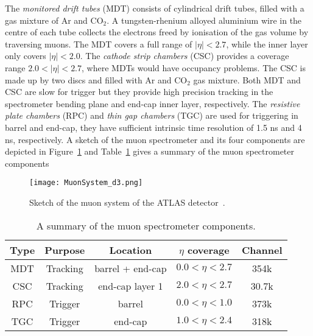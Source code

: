 The \textit{monitored drift tubes} (MDT) consists of cylindrical drift tubes, filled with a gas mixture of Ar and CO$_{2}$.
A tungsten-rhenium alloyed aluminium wire in the centre of each tube collects the electrons freed by ionisation of the gas volume by traversing muons.
The MDT covers a full range of $|\eta| < 2.7$, while the inner layer only covers $|\eta| < 2.0$.
The \textit{cathode strip chambers} (CSC) provides a coverage range $2.0 < |\eta| < 2.7$, where MDTs would have occupancy problems.
The CSC is made up by two discs and filled with Ar and CO$_{2}$ gas mixture.
Both MDT and CSC are slow for trigger but they provide high precision tracking in the spectrometer bending plane and end-cap inner layer, respectively.
The \textit{resistive plate chambers} (RPC) and \textit{thin gap chambers} (TGC) are used for triggering in barrel and end-cap, they have sufficient intrinsic time resolution of 1.5 ns and 4 ns, respectively.
A sketch of the muon spectrometer and its four components are depicted in Figure~\ref{fig:ae_muon_spectrometer} and Table~\ref{tab:ae_muon_spectrometer_components} gives a summary of the muon spectrometer components

\begin{figure}[htbp]
\begin{center}
\texttt{[image: MuonSystem\_d3.png]}
\caption{Sketch of the muon system of the ATLAS detector~\cite{1748-0221-3-08-S08003}.}
\label{fig:ae_muon_spectrometer}
\end{center}
\end{figure}

\begin{table}[htbp]
\begin{center}
\begin{tabular}{ccccc}
\hline
\hline
Type & Purpose & Location & $\eta$ coverage & Channel\\
\hline
MDT & Tracking & barrel + end-cap & $0.0 < \eta < 2.7$ & 354k\\
CSC & Tracking & end-cap layer 1 & $2.0 < \eta < 2.7$ & 30.7k\\
RPC & Trigger & barrel & $0.0 < \eta < 1.0$ & 373k\\
TGC & Trigger & end-cap & $1.0 < \eta < 2.4$ & 318k\\
\hline
\hline
\end{tabular}
\end{center}
\caption{A summary of the muon spectrometer components.}
\label{tab:ae_muon_spectrometer_components}
\end{table}%

